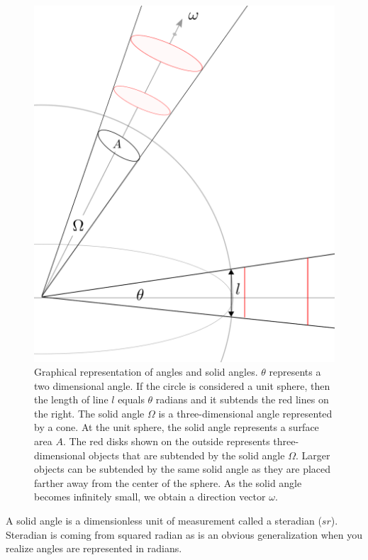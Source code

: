 \documentclass[11pt,a4paper]{report}
\begin{document}
\begin{figure}
\begin{center}
\includegraphics[scale=0.16]{solidangle.png}
\end{center}
\caption{Graphical representation of angles and solid angles. $\theta$ represents a two dimensional angle. If the circle is considered a unit sphere, then the length of line $l$ equals $\theta$ radians and it subtends the red lines on the right. The solid angle $\Omega$ is a three-dimensional angle represented by a cone. At the unit sphere, the solid angle represents a surface area $A$. The red disks shown on the outside represents three-dimensional objects that are subtended by the solid angle $\Omega$. Larger objects can be subtended by the same solid angle as they are placed farther away from the center of the sphere. As the solid angle becomes infinitely small, we obtain a direction vector $\omega$.}
\label{fig_solidangle}
\end{figure}

A solid angle is a dimensionless unit of measurement called a steradian ($sr$). Steradian is coming from squared radian as is an obvious generalization when you realize angles are represented in radians.\\
\end{document}
